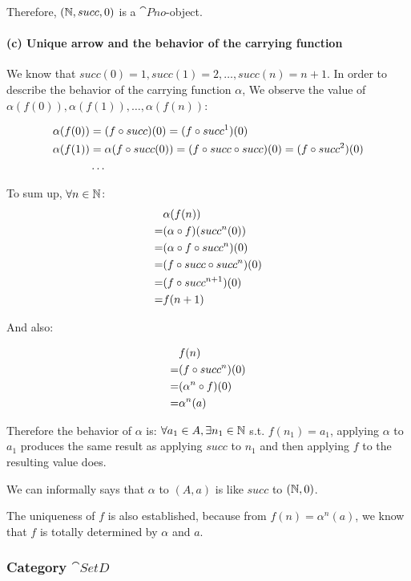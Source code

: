 \documentclass[11pt]{article}
\begin{document}
Therefore, $(\mathbb{N}, succ, 0)$ is a $\cat{Pno}$-object.

\paragraph{(c) Unique arrow and the behavior of the carrying function}\mbox{}

We know that $succ(0) = 1, succ(1) = 2, \ldots, succ(n) = n + 1$.
In order to describe the behavior of the carrying function $\alpha$,
We observe the value of $\alpha(f(0)), \alpha(f(1)), \ldots, \alpha(f(n))$:

\begin{align*}
\alpha(f(0)) & = (f \circ succ)(0) = (f \circ succ^1)(0) \\
\alpha(f(1)) & = \alpha(f \circ succ (0)) = (f \circ succ \circ succ)(0)
= (f \circ succ^2)(0) \\
& \ldots
\end{align*}

To sum up, $\forall n \in \mathbb{N}$:
\begin{align*}
& \alpha(f(n)) \\
= &(\alpha \circ f)(succ^n(0)) \\
= &(\alpha \circ f \circ succ^n) (0) \\
= &(f \circ succ \circ succ^n) (0) \\
= &(f \circ succ^{n+1})(0) \\
= &f(n+1)
\end{align*}

And also:

\begin{align*}
& f(n) \\
= & (f \circ succ^{n})(0) \\
= & (\alpha^n \circ f)(0) \\
= & \alpha^n(a)
\end{align*}

Therefore the behavior of $\alpha$ is: $\forall a_1 \in A, \exists n_1 \in \mathbb{N}$
s.t. $f(n_1) = a_1$, applying $\alpha$ to $a_1$ produces the same result as
applying $succ$ to $n_1$ and then applying $f$ to the resulting value does.

We can informally says that $\alpha$ to $(A,a)$ is like $succ$ to $(\mathbb{N},0)$.

The uniqueness of $f$ is also established, because from $f(n) = \alpha^n(a)$,
we know that $f$ is totally determined by $\alpha$ and $a$.

\subsubsection{Category $\cat{SetD}$}
\end{document}
